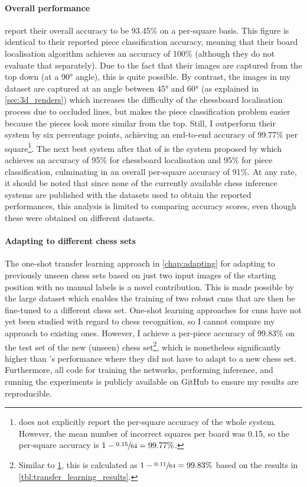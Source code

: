\documentclass[../report.tex]{subfiles}
\begin{document}
\paragraph{Overall performance}
\Textcite{mehta2020} report their overall accuracy to be 93.45\% on a per-square basis.
This figure is identical to their reported piece classification accuracy, meaning that their board localisation algorithm achieves an accuracy of 100\% (although they do not evaluate that separately).
Due to the fact that their images are captured from the top down (at a 90° angle), this is quite possible.
By contrast, the images in my dataset are captured at an angle between 45° and 60° (as explained in \cref{sec:3d_renders}) which increases the difficulty of the chessboard localisation process due to occluded lines, but makes the piece classification problem easier because the pieces look more similar from the top.
Still, I outperform their system by six percentage points, achieving an end-to-end accuracy of 99.77\% per square\footnote{
    \label{ft:per_piece}
     does not explicitly report the per-square accuracy of the whole system.
    However, the mean number of incorrect squares per board was 0.15, so the per-square accuracy is $1-\sfrac{0.15}{64}=99.77\%$.
}.
The next best system after that of \citeauthor{mehta2020} is the system proposed by \textcite{czyzewski2020} which achieves an accuracy of 95\% for chessboard localisation and 95\% for piece classification, culminating in an overall per-square accuracy of 91\%.
At any rate, it should be noted that since none of the currently available chess inference systems are published with the datasets used to obtain the reported performances, this analysis is limited to comparing accuracy scores, even though these were obtained on different datasets.

\paragraph{Adapting to different chess sets}
The one-shot transfer learning approach in \cref{chap:adapting} for adapting to previously unseen chess sets based on just two input images of the starting position with no manual labels is a novel contribution.
This is made possible by the large dataset which enables the training of two robust \glspl{cnn} that are then be fine-tuned to a different chess set.
One-shot learning approaches for \glspl{cnn} have not yet been studied with regard to chess recognition, so I cannot compare my approach to existing ones.
However, I achieve a per-piece accuracy of 99.83\% on the test set of the new (unseen) chess set\footnote{
    Similar to \cref{ft:per_piece}, this is calculated as $1-\sfrac{0.11}{64}=99.83\%$ based on the results in \cref{tbl:transfer_learning_results}.
}, which is nonetheless significantly higher than \citeauthor{mehta2020}'s performance where they did not have to adapt to a new chess set.
Furthermore, all code for training the networks, performing inference, and running the experiments is publicly available on GitHub to ensure my results are reproducible.

\ifSubfilesClassLoaded{%
\printglossary[type=\acronymtype]%
\printbibliography%
}{}%
\end{document}
